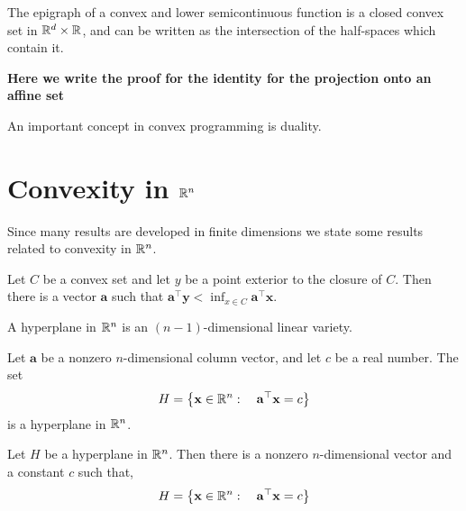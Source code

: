 \begin{theorem}
	The epigraph of a convex and lower semicontinuous function is a closed convex set in $\mathbb{R}^d\times\mathbb{R}$, and can be written as the intersection of the half-spaces which contain it.
\end{theorem}
	\textbf{Here we write the proof for the identity for the projection onto an affine set}
\begin{definition}
\end{definition}
\begin{theorem}
\end{theorem}

An important concept in convex programming is duality.


\begin{definition}[Duality]

\end{definition}

\section{Convexity in $\mathbb{R}^n$}
Since many results are developed in finite dimensions we state some results related to convexity in $\mathbb{R}^n$.
\begin{theorem}
Let $C$ be a convex set and let $y$ be a point exterior to the closure of $C$. Then there is a vector $\mathbf{a}$ such that $\mathbf{a}^\top \mathbf{y} < \inf_{x\in C} \mathbf{a}^\top \mathbf{x}$. 
\end{theorem}

\begin{definition}
	A hyperplane in $\mathbb{R}^n$ is an $(n-1)$-dimensional linear variety.
\end{definition}

\begin{proposition}
	Let $\mathbf{a}$ be a nonzero $n$-dimensional column vector, and let $c$ be a real number. The set
	\begin{equation*}
		H=\left\lbrace \mathbf{x}\in \mathbb{R}^n:\quad \mathbf{a}^\top \mathbf{x}=c \right\rbrace
	\end{equation*}
	is a hyperplane in $\mathbb{R}^n$.
\end{proposition}

\begin{proposition}
	Let $H$ be a hyperplane in $\mathbb{R}^n$. Then there is a nonzero $n$-dimensional vector and a constant $c$ such that,
	\begin{equation*}
		H=\left\lbrace \mathbf{x}\in\mathbb{R}^n:\quad \mathbf{a}^\top \mathbf{x}=c \right\rbrace
	\end{equation*}
\end{proposition}

